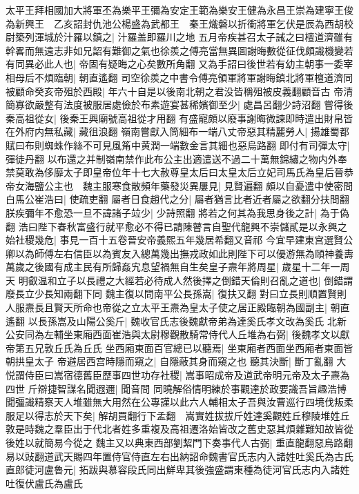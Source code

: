太平王拜相國加大將軍丕為樂平王彌為安定王範為樂安王健為永昌王崇為建寧王俊為新興王　乙亥詔封仇池公楊盛為武都王　秦王熾磐以折衝將軍乞伏是辰為西胡校尉築列渾城於汁羅以鎮之|{
	汁羅盖即羅川之地}
五月帝疾甚召太子誡之曰檀道濟雖有幹畧而無遠志非如兄韶有難御之氣也徐羨之傅亮當無異圖謝晦數從征伐頗識機變若有同異必此人也|{
	帝固有疑晦之心矣數所角翻}
又為手詔曰後世若有幼主朝事一委宰相母后不煩臨朝|{
	朝直遙翻}
司空徐羨之中書令傅亮領軍將軍謝晦鎮北將軍檀道濟同被顧命癸亥帝殂於西殿|{
	年六十自是以後南北朝之君没皆稱殂被皮義翻顧音古}
帝清簡寡欲嚴整有法度被服居處儉於布素遊宴甚稀嬪御至少|{
	處昌呂翻少詩沼翻}
嘗得後秦高祖從女|{
	後秦王興廟號高祖從才用翻}
有盛寵頗以廢事謝晦微諫即時遣出財帛皆在外府内無私藏|{
	藏徂浪翻}
嶺南嘗獻入筒細布一端八丈帝惡其精麗勞人|{
	揚雄蜀都賦曰布則蜘蛛作絲不可見風䇶中黄潤一端數金言其細也惡烏路翻}
即付有司彈太守|{
	彈徒丹翻}
以布還之并制嶺南禁作此布公主出適遣送不過二十萬無錦繡之物内外奉禁莫敢為侈靡太子即皇帝位年十七大赦尊皇太后曰太皇太后立妃司馬氏為皇后晉恭帝女海鹽公主也　魏主服寒食散頻年藥發災異屢見|{
	見賢遍翻}
頗以自憂遣中使密問白馬公崔浩曰|{
	使疏吏翻}
屬者日食趙代之分|{
	屬者猶言比者近者屬之欲翻分扶問翻}
朕疾彌年不愈恐一旦不諱諸子竝少|{
	少詩照翻}
將若之何其為我思身後之計|{
	為于偽翻}
浩曰陛下春秋富盛行就平愈必不得已請陳瞽言自聖代龍興不崇儲貳是以永興之始社稷幾危|{
	事見一百十五卷晉安帝義熙五年幾居希翻又音祁}
今宜早建東宫選賢公卿以為師傅左右信臣以為賓友入總萬幾出撫戎政如此則陛下可以優游無為頤神養夀萬歲之後國有成主民有所歸姦宄息望禍無自生矣皇子燾年將周星|{
	歲星十二年一周天}
明叡温和立子以長禮之大經若必待成人然後擇之倒錯天倫則召亂之道也|{
	倒錯謂廢長立少長知兩翻下同}
魏主復以問南平公長孫嵩|{
	復扶又翻}
對曰立長則順置賢則人服燾長且賢天所命也帝從之立太平王燾為皇太子使之居正殿臨朝為國副主|{
	朝直遙翻}
以長孫嵩及山陽公奚斤|{
	魏收官氏志後魏獻帝弟為達奚氏孝文改為奚氏}
北新公安同為左輔坐東廂西面崔浩與太尉穆觀散騎常侍代人丘堆為右弼|{
	後魏孝文以獻帝第五兄敦丘氏為丘氏}
坐西廂東面百官總已以聽焉|{
	坐東廂者西面坐西廂者東面皆朝拱皇太子}
帝避居西宫時隱而窺之|{
	自隱蔽其身而窺之也}
聽其決斷|{
	斷丁亂翻}
大悦謂侍臣曰嵩宿德舊臣歷事四世功存社稷|{
	嵩事昭成帝及道武帝明元帝及太子燾為四世}
斤辯捷智謀名聞遐邇|{
	聞音問}
同曉解俗情明練於事觀達於政要識吾旨趣浩博聞彊識精察天人堆雖無大用然在公專謹以此六人輔相太子吾與汝曹巡行四境伐叛柔服足以得志於天下矣|{
	解胡買翻行下孟翻　嵩實姓拔拔斤姓達奚觀姓丘穆陵堆姓丘敦是時魏之羣臣出于代北者姓多重複及高祖遷洛始皆改之舊史惡其煩雜難知故皆從後姓以就簡易今從之}
魏主又以典東西部劉絜門下奏事代人古弼|{
	重直龍翻惡烏路翻易以䜴翻道武天賜四年置侍官侍直左右出納詔命魏書官氏志内入諸姓吐奚氏為古氏}
直郎徒河盧魯元|{
	拓跋與慕容段氏同出鮮卑其後強盛謂東種為徒河官氏志内入諸姓吐復伏盧氏為盧氏}
